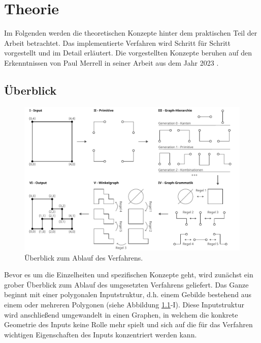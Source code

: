 %

\chapter{Theorie}
Im Folgenden werden die theoretischen Konzepte hinter dem praktischen Teil der Arbeit betrachtet. Das implementierte Verfahren wird
Schritt für Schritt vorgestellt und im Detail erläutert. Die vorgestellten Konzepte beruhen auf den Erkenntnissen von Paul Merrell
in seiner Arbeit aus dem Jahr 2023 \cite{1_merrell}.

\section{Überblick}

\begin{figure}[t]
    \centering
    \includegraphics[width=\imgWidth]{images/overview.pdf}
    \caption{Überblick zum Ablauf des Verfahrens.}
    \label{fig:overview}
\end{figure}

Bevor es um die Einzelheiten und spezifischen Konzepte geht, wird zunächst ein grober Überblick zum Ablauf des umgesetzten
Verfahrens geliefert. Das Ganze beginnt mit einer polygonalen Inputstruktur, d.h. einem Gebilde bestehend aus einem oder mehreren Polygonen
(siehe Abbildung \ref{fig:overview}-I).
Diese Inputstruktur wird anschließend umgewandelt in einen Graphen, in welchem die konkrete Geometrie des Inputs keine Rolle
mehr spielt und sich auf die für das Verfahren wichtigen Eigenschaften des Inputs konzentriert werden kann.

